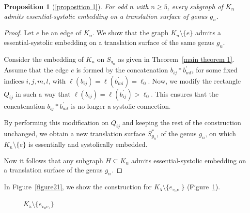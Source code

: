 \documentclass[11pt]{amsart}
\theoremstyle{plain}
\newtheorem*{repprop}{Proposition}
\theoremstyle{definition}
\theoremstyle{remark}
\numberwithin{equation}{section}
\numberwithin{figure}{section}
\begin{document}
\begin{repprop}[\ref{proposition 1}]
  For odd $n$ with $n\geq 5$, every subgraph of $K_n$ admits essential-systolic embedding on a translation surface of genus $g_n$.
\end{repprop}
\begin{proof}
Let $e$ be an edge of $K_n$. We show that the graph $K_n \setminus \{e\}$ admits a essential-systolic embedding on a translation surface of the same genus $g_n$.

Consider the embedding of $K_n$ on $S_{g_n}$ as given in Theorem~\ref{main theorem 1}. Assume that the edge $e$ is formed by the concatenation $b_{ij} * b_{ml}^\prime$, for some fixed indices $i, j, m, l$, with $\ell(b_{ij}) = \ell(b_{ml}^\prime) = \ell_0.$ Now, we modify the rectangle $Q_{ij}$ in such a way that
$
\ell(b_{ij}) = \ell(b_{ij}^\prime) > \ell_0$. This ensures that the concatenation $b_{ij} * b_{ml}^\prime$ is no longer a systolic connection.

By performing this modification on $Q_{ij}$ and keeping the rest of the construction unchanged, we obtain a new translation surface $S_{g_n}^*$, of the genus $g_n$, on which $K_n \setminus \{e\}$ is essentially and systolically embedded.

Now it follows that any subgraph $H \subseteq K_n$ admits essential-systolic embedding on a translation surface of the genus $g_n$.
\end{proof}
In Figure~\ref{figure21}, we show the construction for $K_5\setminus\{e_{v_0v_1}\}$ (Figure~\ref{figure20}). 
\begin{figure}[htbp]
\begin{center}
\caption{$K_5\setminus \{e_{v_0 v_1}\}$}
\label{figure20}
\end{center}
\end{figure}
\end{document}
